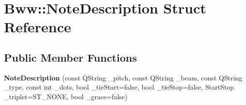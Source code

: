 \hypertarget{struct_bww_1_1_note_description}{}\section{Bww\+:\+:Note\+Description Struct Reference}
\label{struct_bww_1_1_note_description}
\subsection*{Public Member Functions}
\begin{DoxyCompactItemize}
\item 
\mbox{\label{struct_bww_1_1_note_description_ace921b0415b721e48415f42785a91e10}} 
{\bfseries Note\+Description} (const Q\+String \+\_\+pitch, const Q\+String \+\_\+beam, const Q\+String \+\_\+type, const int \+\_\+dots, bool \+\_\+tie\+Start=false, bool \+\_\+tie\+Stop=false, Start\+Stop \+\_\+triplet=S\+T\+\_\+\+N\+O\+NE, bool \+\_\+grace=false)
\end{DoxyCompactItemize}
